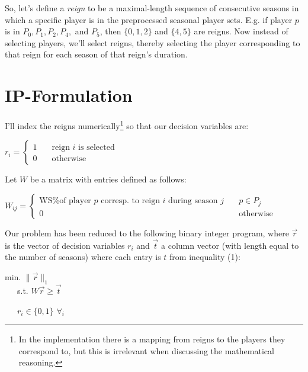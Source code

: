 \documentclass[a4paper,11pt]{article}
\newcommand{\norm}[1]{\lVert#1\rVert}
\begin{document}
So, let's define a \emph{reign} to be a maximal-length sequence of consecutive seasons in which a specific player is in the preprocessed seasonal player sets. E.g. if player $p$ is in $P_0,P_1,P_2,P_4,$ and $P_5$, then $\{0,1,2\}$ and $\{4,5\}$ are reigns. Now instead of selecting players, we'll select reigns, thereby selecting the player corresponding to that reign for each season of that reign's duration. 



\section{IP-Formulation}
I'll index the reigns numerically\footnote{In the implementation there is a mapping from reigns to the players they correspond to, but this is irrelevant when discussing the mathematical reasoning.} so that our decision variables are: 

\begin{center}
$r_{i} = \left\{ \begin{array}{ll}
		            1 & \quad \text{reign } i \text{ is selected}\\
		            0 & \quad \text{otherwise}
		        \end{array}
 		   \right. $
\end{center}


Let $W$ be a matrix with entries defined as follows:

\begin{center}
$W_{ij} = \left\{ \begin{array}{ll}
		            \text{WS\% of player $p$ corresp. to reign } i \text{ during season } j & \quad p \in P_j\\
		            0 & \quad \text{otherwise}
		        \end{array}
 		   \right. $
\end{center}

Our problem has been reduced to the following binary integer program, where $\vec{r}$ is the vector of decision variables $r_i$ and $\vec{t}$ a column vector (with length equal to the number of seasons) where each entry is $t$ from inequality (1): 

\begin{center}
    min. $\norm{\vec{r}}_1$\\

    \, \, \, s.t. $W\vec{r} \ge \vec{t}$
    
   \, \, \, $ r_i \in \{0,1\}$ \! $\forall_i$
\end{center}
\end{document}
